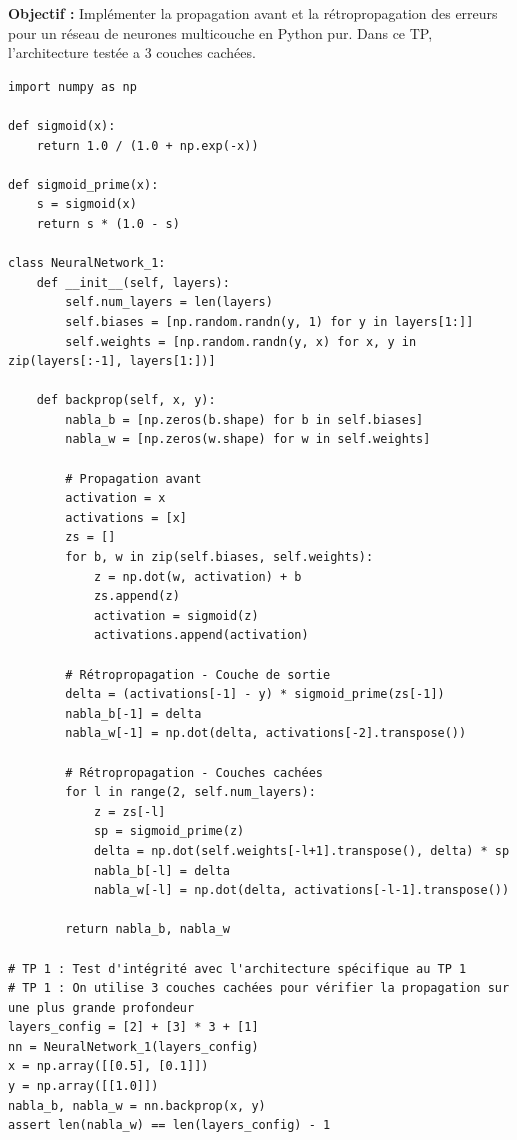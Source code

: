 \documentclass[11pt,a4paper]{article}
\begin{document}
\textbf{Objectif :}
Implémenter la propagation avant et la rétropropagation des erreurs pour un réseau de neurones multicouche en Python pur.
Dans ce TP, l'architecture testée a 3 couches cachées.

\begin{lstlisting}
import numpy as np

def sigmoid(x):
    return 1.0 / (1.0 + np.exp(-x))

def sigmoid_prime(x):
    s = sigmoid(x)
    return s * (1.0 - s)

class NeuralNetwork_1:
    def __init__(self, layers):
        self.num_layers = len(layers)
        self.biases = [np.random.randn(y, 1) for y in layers[1:]]
        self.weights = [np.random.randn(y, x) for x, y in zip(layers[:-1], layers[1:])]

    def backprop(self, x, y):
        nabla_b = [np.zeros(b.shape) for b in self.biases]
        nabla_w = [np.zeros(w.shape) for w in self.weights]

        # Propagation avant
        activation = x
        activations = [x]
        zs = []
        for b, w in zip(self.biases, self.weights):
            z = np.dot(w, activation) + b
            zs.append(z)
            activation = sigmoid(z)
            activations.append(activation)

        # Rétropropagation - Couche de sortie
        delta = (activations[-1] - y) * sigmoid_prime(zs[-1])
        nabla_b[-1] = delta
        nabla_w[-1] = np.dot(delta, activations[-2].transpose())

        # Rétropropagation - Couches cachées
        for l in range(2, self.num_layers):
            z = zs[-l]
            sp = sigmoid_prime(z)
            delta = np.dot(self.weights[-l+1].transpose(), delta) * sp
            nabla_b[-l] = delta
            nabla_w[-l] = np.dot(delta, activations[-l-1].transpose())

        return nabla_b, nabla_w

# TP 1 : Test d'intégrité avec l'architecture spécifique au TP 1
# TP 1 : On utilise 3 couches cachées pour vérifier la propagation sur une plus grande profondeur
layers_config = [2] + [3] * 3 + [1]
nn = NeuralNetwork_1(layers_config)
x = np.array([[0.5], [0.1]])
y = np.array([[1.0]])
nabla_b, nabla_w = nn.backprop(x, y)
assert len(nabla_w) == len(layers_config) - 1
\end{lstlisting}

\vspace{1cm}
\end{document}
